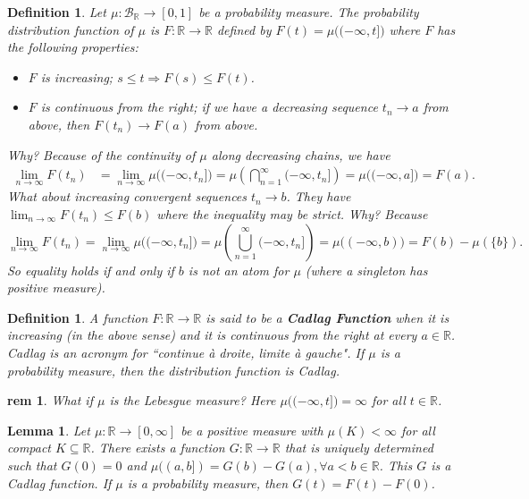\documentclass[letterpaper, 12pt]{article}
\newcommand{\fin}{\qquad \quad \hfill \framebox[1.75mm][l]{\,}}
\newcommand{\cB}{\mathcal{B}}
\newcommand{\bR}{\mathbb{R}}
\theoremstyle{stdthm}
\newtheorem{lem}[thm]{Lemma}
\theoremstyle{stddef}
\newtheorem{defn}[thm]{Definition}
\newtheorem{rem}[thm]{rem} %
\theoremstyle{stdnonum}
\theoremstyle{stdqands}
\theoremstyle{stdbold}
\begin{document}
\begin{defn}
Let $\mu: \cB_\bR \rightarrow [0,1]$ be a probability measure.  The probability distribution function of $\mu$ is $F: \bR \rightarrow \bR$ defined by $F(t) = \mu\big((-\infty,t]\big)$ where $F$ has the following properties:
\begin{itemize}
\item $F$ is increasing; $s\leq t \Rightarrow F(s) \leq F(t)$.
\item $F$ is continuous from the right; if we have a decreasing sequence $t_n \rightarrow a$ from above, then $F(t_n) \rightarrow F(a)$ from above.
\end{itemize}
Why? Because of the continuity of $\mu$ along decreasing chains, we have
\begin{align*}
\lim_{n\rightarrow \infty} F(t_n) &= \lim_{n\rightarrow \infty} \mu\big((-\infty,t_n]\big) = \mu \left(\bigcap_{n=1}^\infty (-\infty, t_n]\right) = \mu\big((-\infty,a]\big) = F(a).
\end{align*} 
What about increasing convergent sequences $t_n \rightarrow b$. They have $\lim_{n\rightarrow \infty} F(t_n) \leq F(b)$ where the inequality may be strict. Why? Because 
\[
\lim_{n\rightarrow \infty}F(t_n) = \lim_{n\rightarrow \infty} \mu\big((-\infty, t_n]\big) = \mu\left(\bigcup_{n=1}^\infty (-\infty, t_n]\right) = \mu\big((-\infty,b)\big) = F(b) - \mu(\{b\}).
\]
So equality holds if and only if $b$ is not an atom for $\mu$ (where a singleton has positive measure). 
\end{defn}

\begin{defn}
A function $F: \bR \rightarrow \bR$ is said to be a {\bf Cadlag Function} when it is increasing (in the above sense) and it is continuous from the right at every $a \in \bR$. Cadlag is an acronym for ``continue \`a droite, limite \`a gauche". If $\mu$ is a probability measure, then the distribution function is Cadlag. 
\end{defn}
\begin{rem}
What if $\mu$ is the Lebesgue measure? Here $\mu\big((-\infty,t]\big) = \infty$ for all $t \in \bR$.
\end{rem}

\begin{lem}
Let $\mu:\bR \rightarrow [0,\infty]$ be a positive measure with $\mu(K) < \infty$ for all compact $K \subseteq \bR$. There exists a function $G:\bR \rightarrow \bR$ that is uniquely determined such that $G(0) = 0$ and $\mu((a,b]) = G(b) - G(a), \forall a<b \in \bR$. This $G$ is a Cadlag function. If $\mu$ is a probability measure, then $G(t) = F(t) - F(0)$.  
\end{lem}
\end{document}
